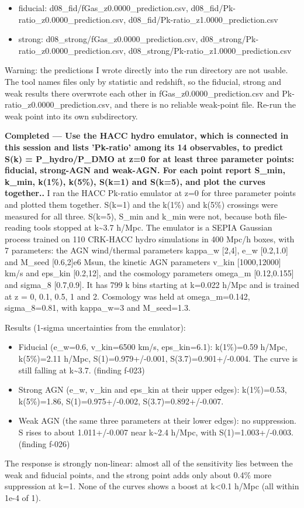 \documentclass[11pt,a4paper]{article}
\begin{document}
\begin{itemize}
  \item fiducial: d08\_fid/fGas\_z0.0000\_prediction.csv, d08\_fid/Pk-ratio\_z0.0000\_prediction.csv, d08\_fid/Pk-ratio\_z1.0000\_prediction.csv
  \item strong: d08\_strong/fGas\_z0.0000\_prediction.csv, d08\_strong/Pk-ratio\_z0.0000\_prediction.csv, d08\_strong/Pk-ratio\_z1.0000\_prediction.csv
\end{itemize}
Warning: the predictions I wrote directly into the run directory are not usable. The tool names files only by statistic and redshift, so the fiducial, strong and weak results there overwrote each other in fGas\_z0.0000\_prediction.csv and Pk-ratio\_z0.0000\_prediction.csv, and there is no reliable weak-point file. Re-run the weak point into its own subdirectory.

\textbf{Completed --- Use the HACC hydro emulator, which is connected in this session and lists 'Pk-ratio' among its 14 observables, to predict S(k) = P\_hydro/P\_DMO at z=0 for at least three parameter points: fiducial, strong-AGN and weak-AGN. For each point report S\_min, k\_min, k(1\%), k(5\%), S(k=1) and S(k=5), and plot the curves together..} I ran the HACC Pk-ratio emulator at z=0 for three parameter points and plotted them together. S(k=1) and the k(1\%) and k(5\%) crossings were measured for all three. S(k=5), S\_min and k\_min were not, because both file-reading tools stopped at k\textasciitilde{}3.7 h/Mpc. The emulator is a SEPIA Gaussian process trained on 110 CRK-HACC hydro simulations in 400 Mpc/h boxes, with 7 parameters: the AGN wind/thermal parameters kappa\_w [2,4], e\_w [0.2,1.0] and M\_seed [0.6,2]e6 Msun, the kinetic AGN parameters v\_kin [1000,12000] km/s and eps\_kin [0.2,12], and the cosmology parameters omega\_m [0.12,0.155] and sigma\_8 [0.7,0.9]. It has 799 k bins starting at k=0.022 h/Mpc and is trained at z = 0, 0.1, 0.5, 1 and 2. Cosmology was held at omega\_m=0.142, sigma\_8=0.81, with kappa\_w=3 and M\_seed=1.3.

Results (1-sigma uncertainties from the emulator):

\begin{itemize}
  \item Fiducial (e\_w=0.6, v\_kin=6500 km/s, eps\_kin=6.1): k(1\%)=0.59 h/Mpc, k(5\%)=2.11 h/Mpc, S(1)=0.979+/-0.001, S(3.7)=0.901+/-0.004. The curve is still falling at k\textasciitilde{}3.7. (finding f-023)
  \item Strong AGN (e\_w, v\_kin and eps\_kin at their upper edges): k(1\%)=0.53, k(5\%)=1.86, S(1)=0.975+/-0.002, S(3.7)=0.892+/-0.007.
  \item Weak AGN (the same three parameters at their lower edges): no suppression. S rises to about 1.011+/-0.007 near k\textasciitilde{}2.4 h/Mpc, with S(1)=1.003+/-0.003. (finding f-026)
\end{itemize}
The response is strongly non-linear: almost all of the sensitivity lies between the weak and fiducial points, and the strong point adds only about 0.4\% more suppression at k=1. None of the curves shows a boost at k\textless{}0.1 h/Mpc (all within 1e-4 of 1).
\end{document}
